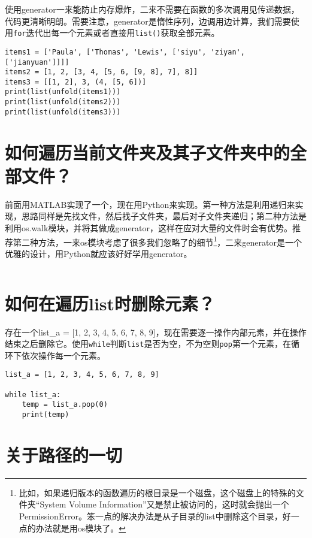 使用generator一来能防止内存爆炸，二来不需要在函数的多次调用见传递数据，代码更清晰明朗。需要注意，generator是惰性序列，边调用边计算，我们需要使用\texttt{for}迭代出每一个元素或者直接用\texttt{list()}获取全部元素。

\begin{verbatim}
items1 = ['Paula', ['Thomas', 'Lewis', ['siyu', 'ziyan', ['jianyuan']]]]
items2 = [1, 2, [3, 4, [5, 6, [9, 8], 7], 8]]
items3 = [[1, 2], 3, (4, [5, 6])]
print(list(unfold(items1)))
print(list(unfold(items2)))
print(list(unfold(items3)))
\end{verbatim}

\section{如何遍历当前文件夹及其子文件夹中的全部文件？}

前面用MATLAB实现了一个，现在用Python来实现。第一种方法是利用递归来实现，思路同样是先找文件，然后找子文件夹，最后对子文件夹递归；第二种方法是利用os.walk模块，并将其做成generator，这样在应对大量的文件时会有优势。推荐第二种方法，一来os模块考虑了很多我们忽略了的细节\footnote{比如，如果递归版本的函数遍历的根目录是一个磁盘，这个磁盘上的特殊的文件夹“System Volume Information”又是禁止被访问的，这时就会抛出一个PermissionError。笨一点的解决办法是从子目录的list中删除这个目录，好一点的办法就是用os模块了。}，二来generator是一个优雅的设计，用Python就应该好好学用generator。

\inputminted{python}{code/python/get_all_file_name.py}

\section{如何在遍历list时删除元素？}

存在一个list\_a = [1, 2, 3, 4, 5, 6, 7, 8, 9]，现在需要逐一操作内部元素，并在操作结束之后删除它。使用\texttt{while}判断\texttt{list}是否为空，不为空则\texttt{pop}第一个元素，在循环下依次操作每一个元素。

\begin{verbatim}
list_a = [1, 2, 3, 4, 5, 6, 7, 8, 9]

while list_a:
    temp = list_a.pop(0)
    print(temp)
\end{verbatim}

\section{关于路径的一切}

